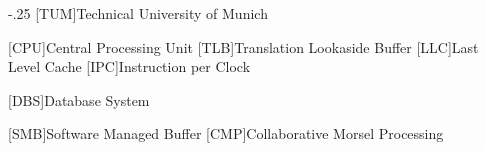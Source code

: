 \documentclass[headsepline,footsepline,footinclude=false,oneside,fontsize=11pt,paper=a4,listof=totoc,bibliography=totoc]{scrbook} %
\begin{document}


\frontmatter{}





\tableofcontents{}

\mainmatter{}







\appendix{}


\begin{acronym}
  \itemsep-.25\baselineskip
  [TUM]{Technical University of Munich}

  [CPU]{Central Processing Unit}
  [TLB]{Translation Lookaside Buffer}
  [LLC]{Last Level Cache}
  [IPC]{Instruction per Clock}

  [DBS]{Database System}

  [SMB]{Software Managed Buffer}
  [CMP]{Collaborative Morsel Processing}
\end{acronym}

\newpage
{}
\listofalgorithms{}
\listoffigures{}
\listoftables{}
\printbibliography{}
\end{document}
